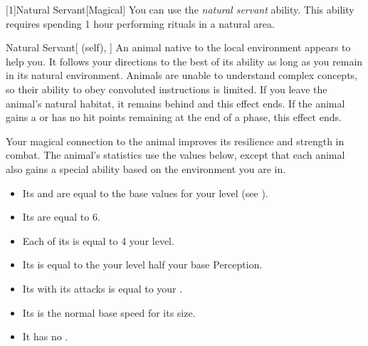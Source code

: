         [1]{Natural Servant}[Magical]
        You can use the \textit{natural servant} ability.
        This ability requires spending 1 hour performing rituals in a natural area.
        \begin{attuneability}{Natural Servant}[ (self), ]
            An animal native to the local environment appears to help you.
            It follows your directions to the best of its ability as long as you remain in its natural environment.
            Animals are unable to understand complex concepts, so their ability to obey convoluted instructions is limited.
            If you leave the animal's natural habitat, it remains behind and this effect ends.
            If the animal gains a  or has no hit points remaining at the end of a phase, this effect ends.

            Your magical connection to the animal improves its resilience and strength in combat.
            The animal's statistics use the values below, except that each animal also gains a special ability based on the environment you are in.
            \begin{itemize}
                \item Its  and  are equal to the base values for your level (see ).
                \item Its  are equal to 6.
                \item Each of its  is equal to 4 \add your level.
                \item Its  is equal to the your level \add half your base Perception.
                \item Its  with its attacks is equal to your .
                \item Its  is the normal base speed for its size.
                \item It has no .
            \end{itemize}
        \end{attuneability}

